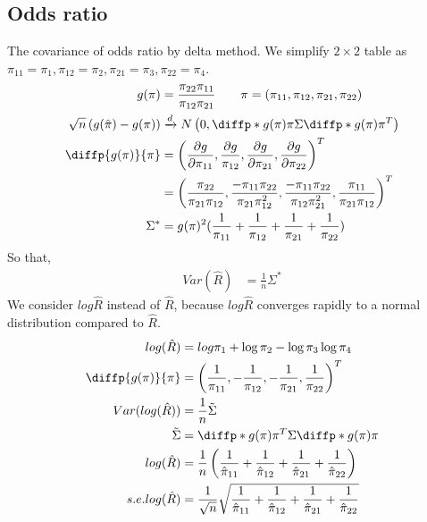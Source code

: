 \subsection{Odds ratio}
	The covariance of odds ratio by delta method. We simplify $2 \times 2$ table as $\pi_{11} = \pi_1, \pi_{12} = \pi_2, \pi_{21} = \pi_3, \pi_{22} = \pi_4$.
	\begin{align*}
		g(\pi) &= \frac{\pi_{22}\pi_{11}}{\pi_{12}\pi_{21}} \qquad \pi=(\pi_{11}, \pi_{12}, \pi_{21}, \pi_{22})\\
		\sqrt{n} \left( g(\hat{\pi}) - g({\pi}) \right) & \xrightarrow[]{d} N \left(0, \diffp*{g(\pi)}{\pi}{} \Sigma \diffp*{g(\pi)}{\pi}{}^T \right)\\
		\diffp{g(\pi)}{\pi}  &= \left( \frac{\partial g}{\partial \pi_{11}}, \frac{\partial g}{\pi_{12}}, \frac{\partial g}{\partial \pi_{21}}, \frac{\partial g}{\partial \pi_{22}} \right)^T\\
		& = \left( \frac{\pi_{22}}{\pi_{21}\pi_{12}}, \frac{-\pi_{11}\pi_{22}}{\pi_{21}\pi_{12}^2}, \frac{-\pi_{11}\pi_{22}}{\pi_{12}\pi_{21}^2}, \frac{\pi_{11}}{\pi_{21}\pi_{12}} \right)^T\\
		\Sigma^{\ast} &= g(\pi)^2(\frac{1}{\pi_{11}} + \frac{1}{\pi_{12}} + \frac{1}{\pi_{21}} + \frac{1}{\pi_{22}})
	\end{align*} 
	So that,
	\begin{align*}
		Var(\hat R) &=  \frac{1}{n} \Sigma^{\ast} 
	\end{align*} 
	We consider $log \hat R$ instead of $\hat R$, because $log \hat R$ converges rapidly to a normal distribution compared to $\hat R$.
	\begin{align*}
		log(\hat{R}) &= log \pi_1 + \log \pi_2 - \log \pi_3  \log \pi_4\\
		\diffp{g(\pi)}{\pi}  &= \left(\frac{1}{\pi_{11}} , -\frac{1}{\pi_{12}}, -\frac{1}{\pi_{21}}, \frac{1}{\pi_{22}} \right)^T\\
		Var(log(\hat{R})) &= \frac{1}{n} \Tilde{\Sigma} \\
		\Tilde{\Sigma} &= \diffp*{g(\pi)}{\pi}{}^T \Sigma \diffp*{g(\pi)}{\pi}{}\\
		log(\hat R) &=  \frac{1}{n}\left( \frac{1}{\hat \pi_{11}} + \frac{1}{\hat \pi_{12}} + \frac{1}{\hat \pi_{21}} + \frac{1}{\hat \pi_{22}} \right)\\
		s.e. log(\hat R) &=  \frac{1}{\sqrt{n}} \sqrt{\frac{1}{\hat \pi_{11}} + \frac{1}{\hat \pi_{12}} + \frac{1}{\hat \pi_{21}} + \frac{1}{\hat \pi_{22}}} 
	\end{align*} 
	
	



